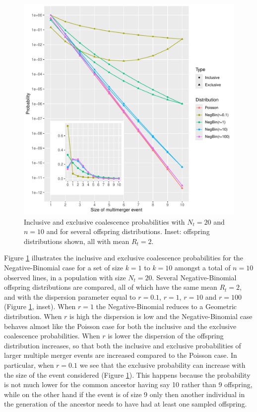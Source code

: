 \documentclass{article}
\begin{document}
\begin{figure}[!p]
\begin{center}
\includegraphics[width=15cm]{../run/figureNegBin2.pdf}
\end{center}
\caption{Inclusive and exclusive coalescence probabilities with $N_t=20$ and $n=10$ and 
for several offspring distributions. Inset: offspring distributions shown, all with mean $R_t=2$.
\label{fig:negbin}}
\end{figure}

Figure \ref{fig:negbin} illustrates the inclusive and exclusive coalescence probabilities for
the Negative-Binomial case for a set of size $k=1$ to $k=10$ amongst a total of $n=10$
 observed lines, in a population with size $N_t=20$. 
Several Negative-Binomial offspring distributions are compared, 
all of which have the same mean $R_t=2$,
and with the dispersion parameter equal to $r=0.1$, $r=1$, $r=10$ and $r=100$
(Figure \ref{fig:negbin}, inset).
When $r=1$ the Negative-Binomial reduces to a Geometric distribution.
When $r$ is high 
the dispersion is low and the Negative-Binomial case 
behaves almost like the Poisson case
for both the inclusive and the exclusive coalescence
probabilities.
When $r$ is lower the dispersion of the
offspring distribution increases, so that 
both the inclusive and exclusive probabilities of larger multiple merger events are increased
compared to the Poisson case.
In particular, when $r=0.1$ we see that the exclusive probability can increase
with the size of the event considered (Figure \ref{fig:negbin}). This happens because
the probability is not much lower for the common ancestor having say 10 rather than 9 offspring,
while on the other hand if the event is of size 9 only then another individual in the generation
of the ancestor needs to have had at least one sampled offspring. 
\end{document}
